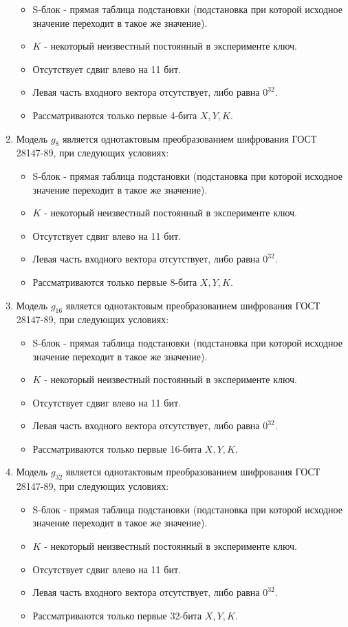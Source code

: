 \begin{enumerate}
\begin{itemize}
		\item S-блок - прямая таблица подстановки (подстановка при которой исходное значение переходит в такое же значение).
		\item $K$ - некоторый неизвестный постоянный в эксперименте ключ.
		\item Отсутствует сдвиг влево на 11 бит.
		\item Левая часть входного вектора отсутствует, либо равна $0^{32}$.
		\item Рассматриваются только первые 4-бита $X, Y, K$.
	\end{itemize}
	\item Модель $g_8$ является однотактовым преобразованием шифрования ГОСТ 28147-89, при следующих условиях:
	\begin{itemize}
		\item S-блок - прямая таблица подстановки (подстановка при которой исходное значение переходит в такое же значение).
		\item $K$ - некоторый неизвестный постоянный в эксперименте ключ.
		\item Отсутствует сдвиг влево на 11 бит.
		\item Левая часть входного вектора отсутствует, либо равна $0^{32}$.
		\item Рассматриваются только первые 8-бита $X, Y, K$.
\end{itemize}
	\item Модель $g_{16}$ является однотактовым преобразованием шифрования ГОСТ 28147-89, при следующих условиях:
\begin{itemize}
	\item S-блок - прямая таблица подстановки (подстановка при которой исходное значение переходит в такое же значение).
	\item $K$ - некоторый неизвестный постоянный в эксперименте ключ.
	\item Отсутствует сдвиг влево на 11 бит.
	\item Левая часть входного вектора отсутствует, либо равна $0^{32}$.
	\item Рассматриваются только первые 16-бита $X, Y, K$.
\end{itemize}
	\item Модель $g_{32}$ является однотактовым преобразованием шифрования ГОСТ 28147-89, при следующих условиях:
\begin{itemize}
	\item S-блок - прямая таблица подстановки (подстановка при которой исходное значение переходит в такое же значение).
	\item $K$ - некоторый неизвестный постоянный в эксперименте ключ.
	\item Отсутствует сдвиг влево на 11 бит.
	\item Левая часть входного вектора отсутствует, либо равна $0^{32}$.
	\item Рассматриваются только первые 32-бита $X, Y, K$.
\end{itemize}
\end{enumerate}

